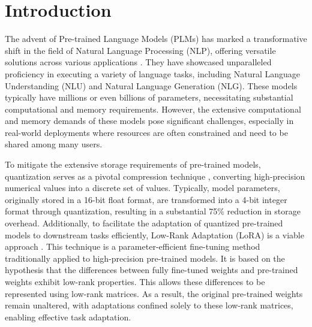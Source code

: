 \section{Introduction}\label{sec:introduction}
The advent of Pre-trained Language Models (PLMs) has marked a transformative shift in the field of Natural Language Processing (NLP), offering versatile solutions across various applications \citep{he2021debertav3, lewis2019bart, touvron2023llama}. They have showcased unparalleled proficiency in executing a variety of language tasks, including Natural Language Understanding (NLU) and Natural Language Generation (NLG). These models typically have millions or even billions of parameters, necessitating substantial computational and memory requirements.
However, the extensive computational and memory demands of these models pose significant challenges, especially in real-world deployments where resources are often constrained and need to be shared among many users.

To mitigate the extensive storage requirements of pre-trained models, quantization serves as a pivotal compression technique \citep{zafrir2019q8bert,  shen2020q, bai2022towards, dettmers2022llm}, converting high-precision numerical values into a discrete set of values. 
Typically, model parameters, originally stored in a 16-bit float format, are transformed into a 4-bit integer format through quantization, resulting in a substantial 75\% reduction in storage overhead.
Additionally, to facilitate the adaptation of quantized pre-trained models to downstream tasks efficiently, Low-Rank Adaptation (LoRA) is a viable approach \citep{hu2021lora}. This technique is a parameter-efficient fine-tuning method traditionally applied to high-precision pre-trained models. It is based on the hypothesis that the differences between fully fine-tuned weights and pre-trained weights exhibit low-rank properties. This allows these differences to be represented using low-rank matrices. As a result, the original pre-trained weights remain unaltered, with adaptations confined solely to these low-rank matrices, enabling effective task adaptation.


